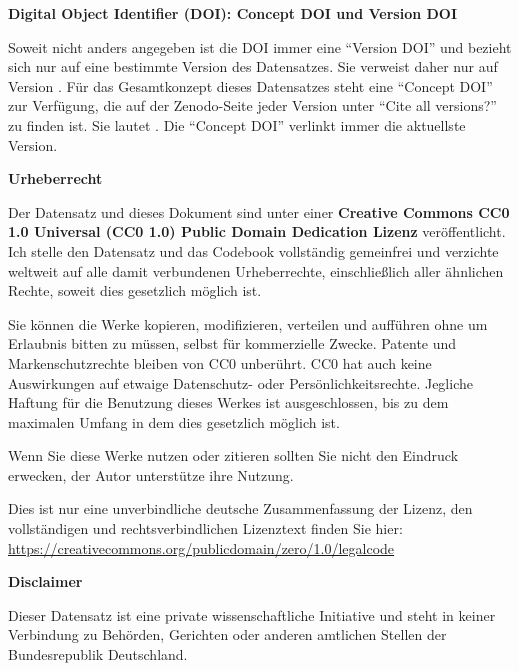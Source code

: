 \vspace{0.5cm}


\textbf{Digital Object Identifier (DOI): Concept DOI und Version DOI}

Soweit nicht anders angegeben ist die DOI immer eine \enquote{Version DOI} und bezieht sich nur auf eine bestimmte Version des Datensatzes. Sie verweist daher nur auf Version \version . Für das Gesamtkonzept dieses Datensatzes steht eine \enquote{Concept DOI} zur Verfügung, die auf der Zenodo-Seite jeder Version unter \enquote{Cite all versions?} zu finden ist. Sie lautet \dataconceptdoi . Die \enquote{Concept DOI} verlinkt immer die aktuellste Version.


\vspace{0.5cm}


\textbf{Urheberrecht}

Der Datensatz und dieses Dokument sind unter einer \textbf{Creative Commons CC0 1.0 Universal (CC0 1.0) Public Domain Dedication Lizenz} veröffentlicht. Ich stelle den Datensatz und das Codebook vollständig gemeinfrei und verzichte weltweit auf alle damit verbundenen Urheberrechte, einschließlich aller ähnlichen Rechte, soweit dies gesetzlich möglich ist. 

Sie können die Werke kopieren, modifizieren, verteilen und aufführen ohne um Erlaubnis bitten zu müssen, selbst für kommerzielle Zwecke. Patente und Markenschutzrechte bleiben von CC0 unberührt. CC0 hat auch keine Auswirkungen auf etwaige Datenschutz- oder Persönlichkeitsrechte. Jegliche Haftung für die Benutzung dieses Werkes ist ausgeschlossen, bis zu dem maximalen Umfang in dem dies gesetzlich möglich ist. 

Wenn Sie diese Werke nutzen oder zitieren sollten Sie nicht den Eindruck erwecken, der Autor unterstütze ihre Nutzung.

Dies ist nur eine unverbindliche deutsche Zusammenfassung der Lizenz, den vollständigen und rechtsverbindlichen Lizenztext finden Sie hier: \url{https://creativecommons.org/publicdomain/zero/1.0/legalcode}

\vspace{0.5cm}

\textbf{Disclaimer} 

Dieser Datensatz ist eine private wissenschaftliche Initiative und steht in keiner Verbindung zu Behörden, Gerichten oder anderen amtlichen Stellen der Bundesrepublik Deutschland.

\newpage